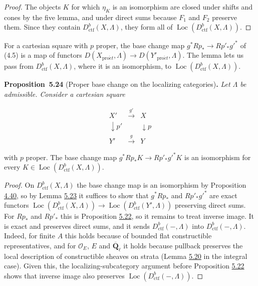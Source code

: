 \documentclass[11pt]{article}
\newenvironment{bpstatement}[2]{\par\addvspace{0.6\baselineskip}\noindent\textbf{#1}#2\textbf{.}\enspace\ignorespaces}
  {\par\addvspace{0.4\baselineskip}}
\newenvironment{bpstatementit}[2]{\begin{bpstatement}{#1}{#2}\itshape\ignorespaces}{\end{bpstatement}}
\providecommand{\Loc}{}\renewcommand{\Loc}{\operatorname{Loc}}
\begin{document}
\begin{proof}[{Proof}]\label{bp486}%
The objects \(K\) for which \(\eta_K\) is an isomorphism are closed under shifts and cones by the five lemma, and under direct sums because \(F_1\) and \(F_2\) preserve them. Since they contain \(D^b_{\mathrm{ctf}}(X,\Lambda)\), they form all of \(\Loc(D^b_{\mathrm{ctf}}(X,\Lambda))\).
\end{proof}

\label{bp487}%
For a cartesian square with \(p\) proper, the base change map \(g^*Rp_*\to Rp'_*g'^*\) of (4.5) is a map of functors \(D(X_{\mathrm{pro}\acute{e}t},\Lambda)\to D(Y'_{\mathrm{pro}\acute{e}t},\Lambda)\). The lemma lets us pass from \(D^b_{\mathrm{ctf}}(X,\Lambda)\), where it is an isomorphism, to \(\Loc(D^b_{\mathrm{ctf}}(X,\Lambda))\).

\label{bp488}%
\begin{bpstatementit}{Proposition~5.24}{ (Proper base change on the localizing categories)}
Let \(\Lambda\) be admissible. Consider a cartesian square

\[
\begin{array}{ccc}
X'&\xrightarrow{g'}&X\\
\downarrow p'&&\downarrow p\\
Y'&\xrightarrow{g}&Y
\end{array}
\]

with \(p\) proper. The base change map \(g^*Rp_*K\to Rp'_*g'^*K\) is an isomorphism for every \(K\in\Loc(D^b_{\mathrm{ctf}}(X,\Lambda))\).
\end{bpstatementit}

\begin{proof}[{Proof}]\label{bp489}%
On \(D^b_{\mathrm{ctf}}(X,\Lambda)\) the base change map is an isomorphism by Proposition \hyperref[bp405]{4.40}, so by Lemma \hyperref[bp485]{5.23} it suffices to show that \(g^*Rp_*\) and \(Rp'_*g'^*\) are exact functors \(\Loc(D^b_{\mathrm{ctf}}(X,\Lambda))\to\Loc(D^b_{\mathrm{ctf}}(Y',\Lambda))\) preserving direct sums. For \(Rp_*\) and \(Rp'_*\) this is Proposition \hyperref[bp482]{5.22}, so it remains to treat inverse image. It is exact and preserves direct sums, and it sends \(D^b_{\mathrm{ctf}}(-,\Lambda)\) into \(D^b_{\mathrm{ctf}}(-,\Lambda)\). Indeed, for finite \(A\) this holds because of bounded flat constructible representatives, and for \(\mathcal O_E\), \(E\) and \(\overline{\mathbf Q}_\ell\) it holds because pullback preserves the local description of constructible sheaves on strata (Lemma \hyperref[bp474]{5.20} in the integral case). Given this, the localizing-subcategory argument before Proposition \hyperref[bp482]{5.22} shows that inverse image also preserves \(\Loc(D^b_{\mathrm{ctf}}(-,\Lambda))\).
\end{proof}
\end{document}
